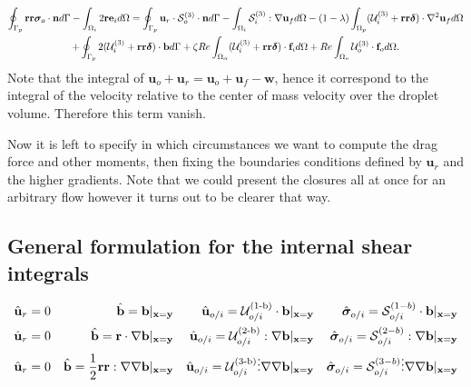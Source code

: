 \begin{multline}
    \intS[p]{\textbf{rr}  \bm\sigma_{o}\cdot \textbf{n}}
    - \intO[i]{2\textbf{re}_i }
    =
    \intS[p]{\textbf{u}_{r}\cdot \mathcal{S}_o^{(3)}\cdot \textbf{n}}
    - \intO[i]{\mathcal{S}_i^{(3)} :\grad\textbf{u}_f}
    - (1-\lambda) \intO[p]{(\mathcal{U}_{i}^{(3)} + \textbf{rr}\bm\delta) \cdot \grad^2 \textbf{u}_f }\\
    + \intS[p]{2(\mathcal{U}_{i}^{(3)} + \textbf{rr}\bm\delta) \cdot  \textbf{b}}
    + \zeta Re \intO{(\mathcal{U}_{i}^{(3)} + \textbf{rr}\bm\delta)\cdot \textbf{f}_{i}} 
    + Re\intO[o]{\mathcal{U}_{o}^{(3)} \cdot \textbf{f}_{o}}.
\end{multline}
Note that the integral of $\textbf{u}_o + \textbf{u}_r = \textbf{u}_o+\textbf{u}_f - \textbf{w}$, hence it correspond to the integral of the velocity relative to the center of mass velocity over the droplet volume. Therefore this term vanish. 

Now it is left to specify in which circumstances we want to compute the drag force and other moments, then fixing the boundaries conditions defined by $\textbf{u}_r$ and the higher gradients. 
Note that we could present the closures all at once for an arbitrary flow however it turns out to be clearer that way. 

\subsection{General formulation for the internal shear integrals}

\begin{align}
    \hat{\textbf{u}}_r = 0
    && 
    \hat{\textbf{b}} = \textbf{b}|_{\textbf{x}=\textbf{y}} 
    && 
    \hat{\textbf{u}}_{o/i} = \mathcal{U}_{o/i}^\text{(1-b)}\cdot  \textbf{b}|_{\textbf{x}=\textbf{y}} 
    && 
    \hat{\bm\sigma}_{o/i} = \mathcal{S}_{o/i}^{(1-b)}\cdot \textbf{b}|_{\textbf{x}=\textbf{y}} \\
    \hat{\textbf{u}}_r = 0
    && 
    \hat{\textbf{b}} = \textbf{r}\cdot \grad\textbf{b}|_{\textbf{x}=\textbf{y}} 
    && 
    \hat{\textbf{u}}_{o/i} = \mathcal{U}_{o/i}^\text{(2-b)}:  \grad\textbf{b}|_{\textbf{x}=\textbf{y}} 
    && 
    \hat{\bm\sigma}_{o/i} = \mathcal{S}_{o/i}^{(2-b)}:\grad \textbf{b}|_{\textbf{x}=\textbf{y}} \\
    \hat{\textbf{u}}_r = 0
    && 
    \hat{\textbf{b}} = \frac{1}{2}\textbf{rr} : \grad\grad\textbf{b}|_{\textbf{x}=\textbf{y}} 
    && 
    \hat{\textbf{u}}_{o/i} = \mathcal{U}_{o/i}^\text{(3-b)}\vdots  \grad\grad\textbf{b}|_{\textbf{x}=\textbf{y}} 
    && 
    \hat{\bm\sigma}_{o/i} = \mathcal{S}_{o/i}^{(3-b)}\vdots\grad\grad \textbf{b}|_{\textbf{x}=\textbf{y}} \\
    \label{eq:test_prob1}
\end{align}

